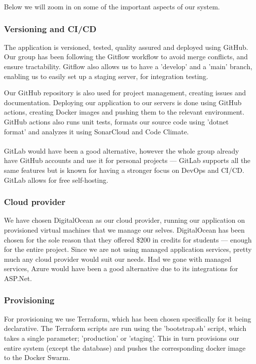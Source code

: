 \noindent Below we will zoom in on some of the important aspects of our system. 

\subsubsection{Versioning and CI/CD}
The application is versioned, tested, quality assured and deployed using
GitHub. Our group has been following the Gitflow workflow to avoid merge conflicts, and ensure tractability. Gitflow also allows us to have a 'develop' and a 'main' branch, enabling us to easily set up a staging server, for integration testing.

Our GitHub repository is also used for project management, creating issues and documentation. Deploying our application to our servers is done using GitHub actions, creating Docker images and pushing them to the relevant environment. GitHub actions also runs unit tests, formats our source code using 'dotnet format' and analyzes it using SonarCloud and Code Climate.\\\\
GitLab would have been a good alternative, however the whole group already have GitHub accounts and use it for personal projects — GitLab supports all the same features but is known for having a stronger focus on DevOps and CI/CD\cite{gitlabvsgithub}. GitLab allows for free self-hosting. 

\subsubsection{Cloud provider}
We have chosen DigitalOcean as our cloud provider, running our application on provisioned virtual machines that we manage our selves. DigitalOcean has been chosen for the sole reason that they offered \$200 in credits for students — enough for the entire project.\newline 
Since we are not using managed application services, pretty much any cloud provider would suit our needs. Had we gone with managed services, Azure would have been a good alternative due to its integrations for ASP.Net.

\subsubsection{Provisioning}
For provisioning we use Terraform, which has been chosen specifically for it being declarative. The Terraform scripts are run using the 'bootstrap.sh' script, which takes a single parameter; 'production' or 'staging'. This in turn provisions our entire system (except the database) and pushes the corresponding docker image to the Docker Swarm.

